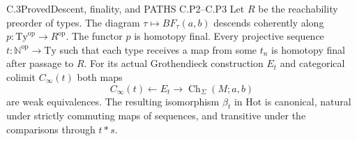 \begin{claim}{C.3}{Proved}{Descent, finality, and PATHS C.P2--C.P3}
Let $R$ be the reachability preorder of types. The diagram
$\tau\mapsto BF_\tau(a,b)$ descends coherently along
$p:\mathrm{Ty}^{\mathrm{op}}\to R^{\mathrm{op}}$.
The functor $p$ is homotopy final. Every projective sequence
$t:\mathbb N^{\mathrm{op}}\to\mathrm{Ty}$ such that each type
receives a map from some $t_n$ is homotopy final after passage to
$R$. For its actual Grothendieck construction $E_t$ and categorical
colimit $C_\infty(t)$ both maps
\[
 C_\infty(t)\longleftarrow E_t\longrightarrow
 \operatorname{Ch}_\Sigma(M;a,b)
\]
are weak equivalences. The resulting isomorphism $\beta_t$ in
$\mathrm{Hot}$ is canonical, natural under strictly commuting maps
of sequences, and transitive under the comparisons through $t*s$.
\end{claim}
